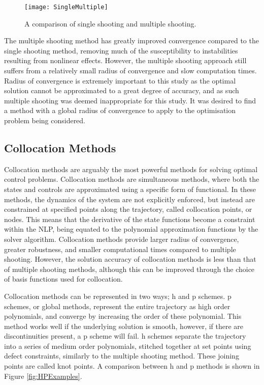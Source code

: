 \begin{figure}[ht]
	\centering
	\texttt{[image: SingleMultiple]}
	\caption{A comparison of single shooting and multiple shooting\cite{Kelly2015}.}
	\label{fig:multipleshooting}
\end{figure}

The multiple shooting method has greatly improved convergence compared to the single shooting method, removing much of the susceptibility to instabilities resulting from nonlinear effects. However, the multiple shooting approach still suffers from a relatively small radius of convergence and slow computation times\cite{Fasano2013}. Radius of convergence is extremely important to this study as the optimal solution cannot be approximated to a great degree of accuracy, and as such multiple shooting was deemed inappropriate for this study. It was desired to find a method with a global radius of convergence to apply to the optimisation problem being considered.



\subsection{Collocation Methods}

Collocation methods are arguably the most powerful methods for solving optimal control problems\cite{Rao2009}. Collocation methods are simultaneous methods, where both the states and controls are approximated using a specific form of functional\cite{Kelly2015,Rao2009}. In these methods, the dynamics of the system are not explicitly enforced, but instead are constrained at specified points along the trajectory, called collocation points, or nodes\cite{Kelly2015}. This means that the derivative of the state functions become a constraint within the NLP, being equated to the polynomial approximation functions by the solver algorithm. 
Collocation methods provide larger radius of convergence, greater robustness, and smaller computational times compared to multiple shooting\cite{Fasano2013}. However, the solution accuracy of collocation methods is less than that of multiple shooting methods\cite{Fasano2013}, although this can be improved through the choice of basis functions used for collocation\cite{Rao2009}.

Collocation methods can be represented in two ways; \textsf{h} and \textsf{p} schemes\cite{Kelly2015}. \textsf{p} schemes, or global methods, represent the entire trajectory as high order polynomials, and converge by increasing the order of these polynomial\cite{Kelly2015}. This method works well if the underlying solution is smooth, however, if there are discontinuities present, a \textsf{p} scheme will fail\cite{Kelly2015}. \textsf{h} schemes separate the trajectory into a series of medium order polynomials, stitched together at set points using defect constraints, similarly to the multiple shooting method\cite{Kelly2015,Rao2009,Ross2004}. These joining points are called knot points\cite{Kelly2015,Ross2004}. A comparison between \textsf{h} and \textsf{p} methods is shown in Figure \ref{fig:HPExamples}.

